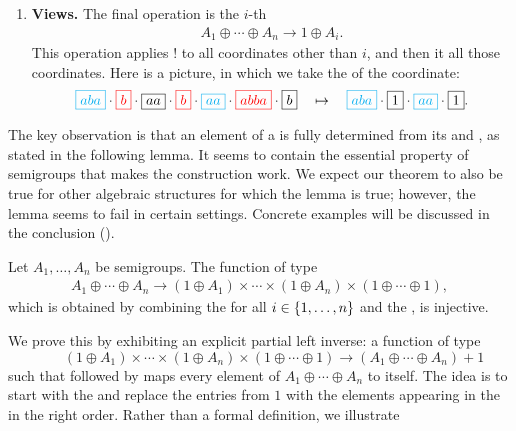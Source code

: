 \begin{enumerate}
        \item \AP \textbf{Views.} The final operation is the $i$-th 
        \begin{align*}
        A_1 \oplus \cdots \oplus A_n \to 1 \oplus A_i.
        \end{align*}
        This operation applies $!$ to all coordinates other than $i$, and then it  all those coordinates. Here is a picture, in which we take the  of the  coordinate:
        \begin{align*}
            {\color{cyan}\boxed{aba}} \cdot 
            {\color{red}\boxed{b}} \cdot 
            \boxed{aa} \cdot 
            {\color{red}\boxed{b}} \cdot 
            {\color{cyan}\boxed{aa}} \cdot 
            {\color{red}\boxed{abba}} \cdot 
            \boxed{b}
            \quad \mapsto \quad  
            {\color{cyan}\boxed{aba}} \cdot 
            {\boxed{1}} \cdot 
            {\color{cyan}\boxed{aa}} \cdot 
            \boxed{1}.
        \end{align*}
\end{enumerate}
The key observation is that an element of a  is fully determined
from its  and , as stated in the following lemma.
It seems to contain the essential property of semigroups that makes the
construction work. We expect our theorem to also be true for other algebraic
structures for which the lemma is true; however, the lemma seems to fail in
certain settings. Concrete examples will be discussed in the conclusion ().
\begin{lemma}
\label{lem:views} Let $A_1,\ldots,A_n$ be semigroups. The  function of type
\begin{align*}
A_1 \oplus \cdots \oplus A_n \longrightarrow (1 \oplus A_1) \times \cdots \times (1 \oplus A_n) \times (1 \oplus \cdots \oplus 1),
\end{align*}
which is obtained by combining the  for all $i \in \{1,\ldots,n\}$ and the , is injective. 
\end{lemma}
\AP We prove this by exhibiting an explicit partial left inverse: a
 function of type
\[ \qquad (1 \oplus A_1) \times \cdots \times (1 \oplus A_n) \times (1 \oplus
  \cdots \oplus 1) \longrightarrow (A_1 \oplus \cdots \oplus A_n) + 1 \]
such that  followed by  maps every element of $A_1
\oplus \cdots \oplus A_n$ to itself. The idea is to start with the 
and replace the entries from $1$ with the elements appearing in the
 in the right order. Rather than a formal definition, we illustrate
